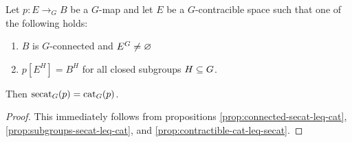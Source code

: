 \begin{corollary}
    Let $p : E \to_G B$ be a $G$-map and let $E$ be a $G$-contracible space such that one of the following holds:
    \begin{enumerate}
        \item $B$ is $G$-connected and $E^G \neq \varnothing$
        \item $p[E^H] = B^H$ for all closed subgroups $H \subseteq G$.
    \end{enumerate}
    Then $\operatorname{secat}_G(p) = \operatorname{cat}_G(p)$.
    \begin{proof}
        This immediately follows from propositions \ref{prop:connected-secat-leq-cat}, \ref{prop:subgroups-secat-leq-cat}, and \ref{prop:contractible-cat-leq-secat}.
    \end{proof}
\end{corollary}
